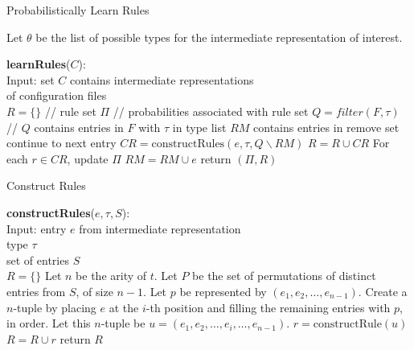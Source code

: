 \begin{algorithm}
\caption{Probabilistically Learn Rules}
\label{alg:plearn}
  Let $\theta$ be the list of possible types for the intermediate representation of interest.
  \begin{algorithmic}[1]
  \State \textbf{learnRules}($C$):\\

  Input: set $C$ contains intermediate representations\\ 
     \qquad \enspace \enspace of configuration files\\

    \State $R = \{\}$ // rule set
    \State $\Pi$ // probabilities associated with rule set
        \State $Q = filter(F,\tau)$ 
        \State // $Q$ contains entries in $F$ with $\tau$ in type list
        \State $RM$ contains entries in remove set
                        \State continue to next entry
                        \Else \enspace $CR = \textrm{constructRules}(e, \tau, Q \backslash RM)$
                        \State $R = R  \cup CR$
                        \State For each $r \in CR$, update $\Pi$ 
               \EndIf
               \State $RM = RM \cup e$
        \EndFor
     \EndFor
    \EndFor
    \State return $(\Pi,R)$
  \end{algorithmic}
\end{algorithm}


\begin{algorithm}
\caption{Construct Rules}
\label{alg:crules}
  \begin{algorithmic}[1]
  \State \textbf{constructRules}($e, \tau, S$):\\
    Input: entry $e$ from intermediate representation\\ 
     \qquad \enspace \enspace type $\tau$\\
     \qquad \enspace \enspace set of entries $S$\\
     $R = \{\}$
        \State Let $n$ be the arity of $t$.
        \State Let $P$ be the set of permutations of distinct entries from $S$, of size $n-1$. 
         \State Let $p$ be represented by $(e_1, e_2, \ldots, e_{n-1})$.
           \State Create a $n$-tuple by placing $e$ at the $i$-th position and filling the remaining entries with $p$, in order. Let this $n$-tuple be $u = (e_1, e_2, \ldots, e_i, \ldots, e_{n-1})$.
           \State $r = \textrm{constructRule}(u)$ 
              $R = R \cup r$
            \EndIf
          \EndFor
        \EndFor
     \EndFor
     \State return $R$
  \end{algorithmic}
\end{algorithm}

